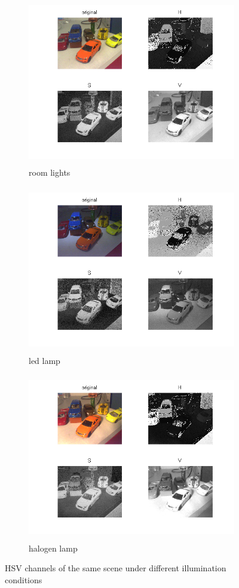 \documentclass[
a4paper,     %
11pt         %
]{scrartcl}  %
\begin{document}
\newpage
\begin{figure}[ht!]
\centering
\begin{subfigure}{\textwidth}
  \centering
  \includegraphics[trim=60px 40px 60px 0, clip, height=7.3cm]{./Bildg_Messtechnik_Lab/ColorSpaces/html/main_02.png}
  \caption{room lights}
\end{subfigure}
\begin{subfigure}{\textwidth}
  \centering
  \includegraphics[trim=60px 40px 60px 0, clip, height=7.3cm]{./Bildg_Messtechnik_Lab/ColorSpaces/html/main_06.png}
  \caption{led lamp} \label{fig:colSpa_HSVb}
\end{subfigure}
\begin{subfigure}{\textwidth}
  \centering
  \includegraphics[trim=60px 40px 60px 0, clip, height=7.3cm]{./Bildg_Messtechnik_Lab/ColorSpaces/html/main_10.png}
  \caption{halogen lamp}
\end{subfigure}
\caption{HSV channels of the same scene under different illumination conditions}
\label{fig:colSpa_HSV}
\end{figure}
\end{document}
